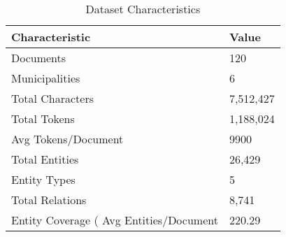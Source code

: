 \begin{table}
\caption{Dataset Characteristics}
\label{tab:dataset_char}
\begin{tabular}{ll}
\toprule
Characteristic & Value \\
\midrule
Documents & 120 \\
Municipalities & 6 \\
Total Characters & 7,512,427 \\
Total Tokens & 1,188,024 \\
Avg Tokens/Document & 9900 \\
Total Entities & 26,429 \\
Entity Types & 5 \\
Total Relations & 8,741 \\
Entity Coverage (%
Avg Entities/Document & 220.29 \\
\bottomrule
\end{tabular}
\end{table}
